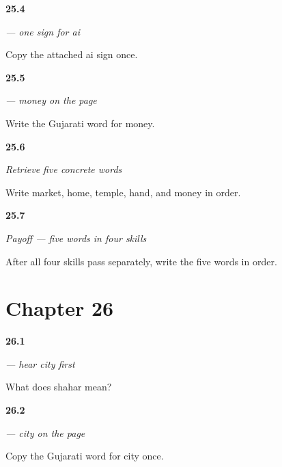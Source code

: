 \noindent\begin{minipage}[t]{\linewidth}
\raggedright
\hypertarget{review-GU-W21-ai-matra-copy}{\textbf{25.4}} \emph{ — one sign for ai}\par
\small Copy the attached ai sign once.
\end{minipage}\par\medskip

\noindent\begin{minipage}[t]{\linewidth}
\raggedright
\hypertarget{review-GU-C21-paisa-write}{\textbf{25.5}} \emph{ — money on the page}\par
\small Write the Gujarati word for money.
\end{minipage}\par\medskip

\noindent\begin{minipage}[t]{\linewidth}
\raggedright
\hypertarget{review-GU-R21-travel-five-recall}{\textbf{25.6}} \emph{Retrieve five concrete words}\par
\small Write market, home, temple, hand, and money in order.
\end{minipage}\par\medskip

\noindent\begin{minipage}[t]{\linewidth}
\raggedright
\hypertarget{review-GU-C21-travel-five-payoff}{\textbf{25.7}} \emph{Payoff — five words in four skills}\par
\small After all four skills pass separately, write the five words in order.
\end{minipage}\par\medskip

\section*{Chapter 26}

\noindent\begin{minipage}[t]{\linewidth}
\raggedright
\hypertarget{review-GU-C22-hear-shahar-recall}{\textbf{26.1}} \emph{ — hear city first}\par
\small What does shahar mean?
\end{minipage}\par\medskip

\noindent\begin{minipage}[t]{\linewidth}
\raggedright
\hypertarget{review-GU-C22-shahar-copy}{\textbf{26.2}} \emph{ — city on the page}\par
\small Copy the Gujarati word for city once.
\end{minipage}\par\medskip

